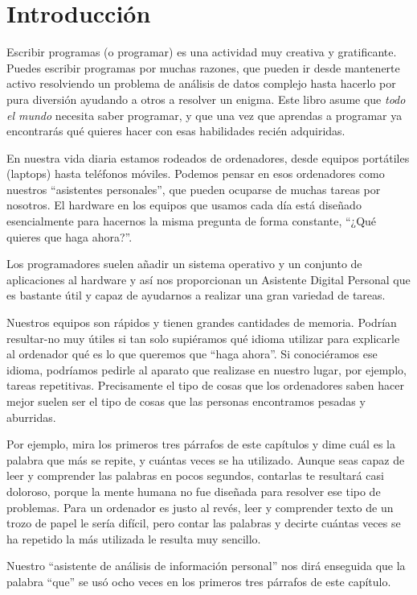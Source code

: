 \hypertarget{introduccion}{%
\section{Introducción}\label{introduccion}}

Escribir programas (o programar) es una actividad muy creativa y
gratificante. Puedes escribir programas por muchas razones, que pueden
ir desde mantenerte activo resolviendo un problema de análisis de datos
complejo hasta hacerlo por pura diversión ayudando a otros a resolver un
enigma. Este libro asume que \emph{todo el mundo} necesita saber
programar, y que una vez que aprendas a programar ya encontrarás qué
quieres hacer con esas habilidades recién adquiridas.

En nuestra vida diaria estamos rodeados de ordenadores, desde equipos
portátiles (laptops) hasta teléfonos móviles. Podemos pensar en esos
ordenadores como nuestros ``asistentes personales'', que pueden ocuparse
de muchas tareas por nosotros. El hardware en los equipos que usamos
cada día está diseñado esencialmente para hacernos la misma pregunta de
forma constante, ``¿Qué quieres que haga ahora?''.

Los programadores suelen añadir un sistema operativo y un conjunto de
aplicaciones al hardware y así nos proporcionan un Asistente Digital
Personal que es bastante útil y capaz de ayudarnos a realizar una gran
variedad de tareas.

Nuestros equipos son rápidos y tienen grandes cantidades de memoria.
Podrían resultar-no muy útiles si tan solo supiéramos qué idioma
utilizar para explicarle al ordenador qué es lo que queremos que ``haga
ahora''. Si conociéramos ese idioma, podríamos pedirle al aparato que
realizase en nuestro lugar, por ejemplo, tareas repetitivas.
Precisamente el tipo de cosas que los ordenadores saben hacer mejor
suelen ser el tipo de cosas que las personas encontramos pesadas y
aburridas.

Por ejemplo, mira los primeros tres párrafos de este capítulos y dime
cuál es la palabra que más se repite, y cuántas veces se ha utilizado.
Aunque seas capaz de leer y comprender las palabras en pocos segundos,
contarlas te resultará casi doloroso, porque la mente humana no fue
diseñada para resolver ese tipo de problemas. Para un ordenador es justo
al revés, leer y comprender texto de un trozo de papel le sería difícil,
pero contar las palabras y decirte cuántas veces se ha repetido la más
utilizada le resulta muy sencillo.

Nuestro ``asistente de análisis de información personal'' nos dirá
enseguida que la palabra ``que'' se usó ocho veces en los primeros tres
párrafos de este capítulo.

